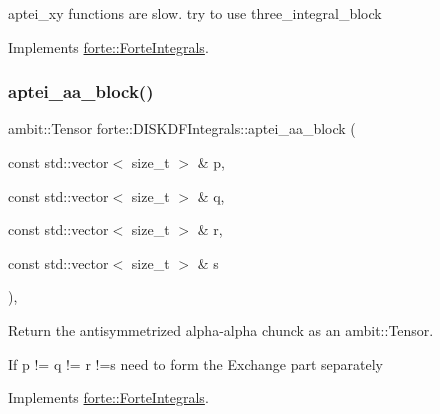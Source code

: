 aptei\+\_\+xy functions are slow. try to use three\+\_\+integral\+\_\+block 



Implements \mbox{\hyperlink{classforte_1_1_forte_integrals_afc84c157025b56ee0f8e3b1abe1c0a5f}{forte\+::\+Forte\+Integrals}}.

\mbox{\label{classforte_1_1_d_i_s_k_d_f_integrals_a2709b0116f0e44fc1eb8038a2b7afd54}} 
\subsubsection{\texorpdfstring{aptei\+\_\+aa\+\_\+block()}{aptei\_aa\_block()}}
{\footnotesize\ttfamily ambit\+::\+Tensor forte\+::\+D\+I\+S\+K\+D\+F\+Integrals\+::aptei\+\_\+aa\+\_\+block (\begin{DoxyParamCaption}\item[{const std\+::vector$<$ size\+\_\+t $>$ \&}]{p,  }\item[{const std\+::vector$<$ size\+\_\+t $>$ \&}]{q,  }\item[{const std\+::vector$<$ size\+\_\+t $>$ \&}]{r,  }\item[{const std\+::vector$<$ size\+\_\+t $>$ \&}]{s }\end{DoxyParamCaption})\hspace{0.3cm}{\ttfamily [override]}, {\ttfamily [virtual]}}



Return the antisymmetrized alpha-\/alpha chunck as an ambit\+::\+Tensor. 

If p != q != r !=s need to form the Exchange part separately 

Implements \mbox{\hyperlink{classforte_1_1_forte_integrals_ac20ae649b8cfe116f8583d676e43da27}{forte\+::\+Forte\+Integrals}}.

\mbox{\label{classforte_1_1_d_i_s_k_d_f_integrals_aa0ab48ce47dab83c35bf3b9433273f59}} 

